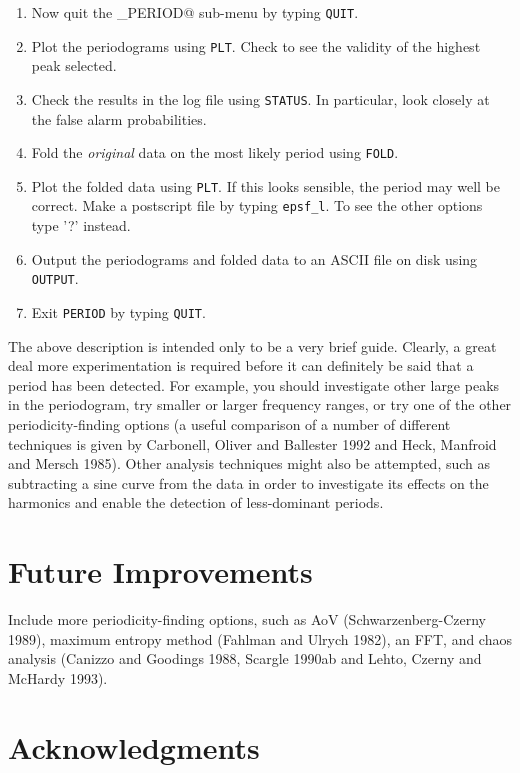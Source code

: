 \begin{enumerate}
\item Now quit the \verb@PERIOD_PERIOD@ sub-menu by typing {\tt QUIT}.
\item Plot the periodograms using {\tt PLT}. Check to see the validity of the
highest peak selected.
\item Check the results in the log file using {\tt STATUS}. In particular, look
closely at the false alarm probabilities.
\item Fold the {\em original} data on the most likely period using {\tt FOLD}.
\item Plot the folded data using {\tt PLT}. If this looks sensible, the period
may well be correct. Make a postscript file by typing {\tt epsf\_l}. To
see the other options type '?' instead. 
\item Output the periodograms and folded data to an ASCII file on disk using
{\tt OUTPUT}. 
\item Exit {\tt PERIOD} by typing {\tt QUIT}. 
\end{enumerate}

The above description is intended only to be a very brief guide. Clearly, a
great deal more experimentation is required before it can definitely be said that
a period has been detected. For example, you should investigate other large
peaks in the periodogram, try smaller or larger frequency ranges, or try one of
the other periodicity-finding options (a useful comparison of a number of
different techniques is given by Carbonell, Oliver and Ballester 1992 and Heck,
Manfroid and Mersch 1985). Other analysis techniques might also be attempted,
such as subtracting a sine curve from the data in order to investigate its
effects on the harmonics and enable the detection of less-dominant periods. 

\section{Future Improvements}

Include more periodicity-finding options, such as AoV
(Schwarzenberg-Czerny 1989), maximum entropy method (Fahlman and Ulrych 1982),
an FFT, and chaos analysis (Canizzo and Goodings 1988, Scargle 1990ab and
Lehto, Czerny and McHardy 1993). 

\section{Acknowledgments}

